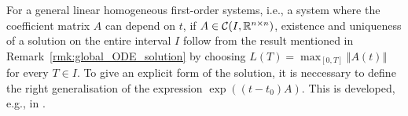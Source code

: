\begin{rmk}
	For a general linear homogeneous first-order systems, i.e., a system where the coefficient matrix $A$ can depend on $t$, if $A\in \mathcal{C}(I,\mathbb{R}^{n\times n})$, existence and uniqueness of a solution on the entire interval $I$ follow from the result mentioned in Remark~\ref{rmk:global_ODE_solution} by choosing $L(T) = \max_{[0,T]}\Vert A(t)\Vert$ for every $T\in I$. To give an explicit form of the solution, it is neccessary to define the right generalisation of the expression $\exp((t-t_0)A)$. This is developed, e.g., in \cite[Section~3.4, pp.~80-86]{Teschl2012}. 
\end{rmk}